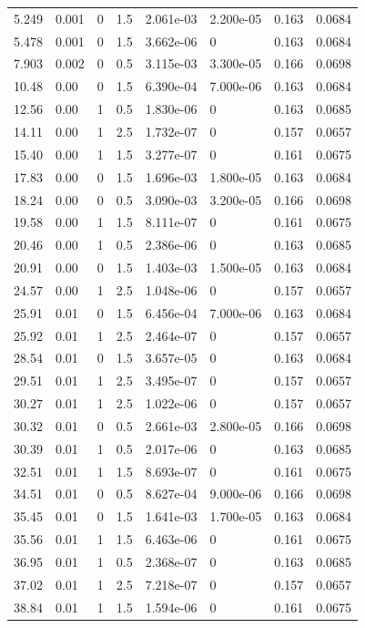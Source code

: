 \documentclass[preview]{standalone}
\begin{document}
{{\begin{tabular}{L{1.2cm}C{1.2cm} C{0.3cm}C{0.5cm} C{1.4cm}C{1.4cm} C{1.4cm}C{1.4cm}}
  5.249  &  0.001  & 0     & 1.5 &  2.061e-03  & 2.200e-05  & 0.163 &  0.0684   \\ 
  5.478  &  0.001  & 0     & 1.5 &  3.662e-06  & 0  & 0.163 &  0.0684   \\ 
  7.903  &  0.002  & 0     & 0.5 &  3.115e-03  & 3.300e-05  & 0.166 &  0.0698   \\ 
  10.48  &  0.00  & 0     & 1.5 &  6.390e-04  & 7.000e-06  & 0.163 &  0.0684   \\ 
  12.56  &  0.00  & 1     & 0.5 &  1.830e-06  & 0  & 0.163 &  0.0685   \\ 
  14.11  &  0.00  & 1     & 2.5 &  1.732e-07  & 0  & 0.157 &  0.0657   \\ 
  15.40  &  0.00  & 1     & 1.5 &  3.277e-07  & 0  & 0.161 &  0.0675   \\ 
  17.83  &  0.00  & 0     & 1.5 &  1.696e-03  & 1.800e-05  & 0.163 &  0.0684   \\ 
  18.24  &  0.00  & 0     & 0.5 &  3.090e-03  & 3.200e-05  & 0.166 &  0.0698   \\ 
  19.58  &  0.00  & 1     & 1.5 &  8.111e-07  & 0  & 0.161 &  0.0675   \\ 
  20.46  &  0.00  & 1     & 0.5 &  2.386e-06  & 0  & 0.163 &  0.0685   \\ 
  20.91  &  0.00  & 0     & 1.5 &  1.403e-03  & 1.500e-05  & 0.163 &  0.0684   \\ 
  24.57  &  0.00  & 1     & 2.5 &  1.048e-06  & 0  & 0.157 &  0.0657   \\ 
  25.91  &  0.01  & 0     & 1.5 &  6.456e-04  & 7.000e-06  & 0.163 &  0.0684   \\ 
  25.92  &  0.01  & 1     & 2.5 &  2.464e-07  & 0  & 0.157 &  0.0657   \\ 
  28.54  &  0.01  & 0     & 1.5 &  3.657e-05  & 0  & 0.163 &  0.0684   \\ 
  29.51  &  0.01  & 1     & 2.5 &  3.495e-07  & 0  & 0.157 &  0.0657   \\ 
  30.27  &  0.01  & 1     & 2.5 &  1.022e-06  & 0  & 0.157 &  0.0657   \\ 
  30.32  &  0.01  & 0     & 0.5 &  2.661e-03  & 2.800e-05  & 0.166 &  0.0698   \\ 
  30.39  &  0.01  & 1     & 0.5 &  2.017e-06  & 0  & 0.163 &  0.0685   \\ 
  32.51  &  0.01  & 1     & 1.5 &  8.693e-07  & 0  & 0.161 &  0.0675   \\ 
  34.51  &  0.01  & 0     & 0.5 &  8.627e-04  & 9.000e-06  & 0.166 &  0.0698   \\ 
  35.45  &  0.01  & 0     & 1.5 &  1.641e-03  & 1.700e-05  & 0.163 &  0.0684   \\ 
  35.56  &  0.01  & 1     & 1.5 &  6.463e-06  & 0  & 0.161 &  0.0675   \\ 
  36.95  &  0.01  & 1     & 0.5 &  2.368e-07  & 0  & 0.163 &  0.0685   \\ 
  37.02  &  0.01  & 1     & 2.5 &  7.218e-07  & 0  & 0.157 &  0.0657   \\ 
  38.84  &  0.01  & 1     & 1.5 &  1.594e-06  & 0  & 0.161 &  0.0675   \\ 
\hline 
\end{tabular} 

}}
\end{document}
